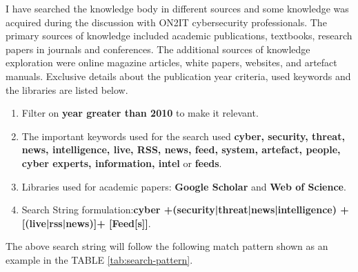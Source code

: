 I have searched the knowledge body in different sources and some knowledge was acquired during the discussion with ON2IT cybersecurity professionals. 
The primary sources of knowledge included academic publications, textbooks, research papers in journals and conferences. The additional sources of knowledge exploration were online magazine articles, white papers, websites, and artefact manuals. 
Exclusive details about the publication year criteria, used keywords and the libraries are listed below.
\begin{enumerate}
    \item  Filter on \textbf{year greater than 2010} to make it relevant.
    \item  The important keywords used for the search used 
        \textbf{cyber, security, threat, news, intelligence, live, RSS, news, feed, system, artefact, people, cyber experts, information, intel} or \textbf{feeds}.
    \item  Libraries used for academic papers: \textbf{Google Scholar} and \textbf{Web of Science}.
    \item  Search String formulation:\textbf{cyber +(security|threat|news|intelligence) + [(live|rss|news)]+ [Feed[s]]}.

\end{enumerate}

The above search string will follow the following match pattern shown as an example in the TABLE \ref{tab:search-pattern}.



\begin{table}
    \caption{Illustration of search pattern: Literature Search Analogy}
    \label{tab:search-pattern}
    \centering{}
\end{table}

